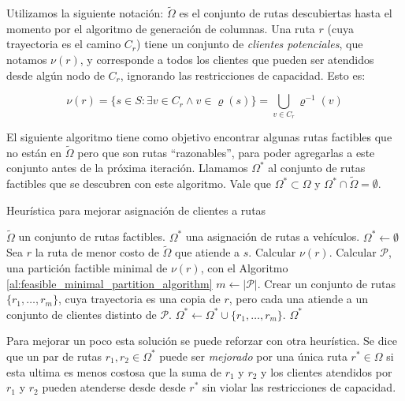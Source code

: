 Utilizamos la siguiente notación: $\tilde{\Omega}$ es el conjunto de rutas descubiertas hasta el momento por el algoritmo de generación de columnas. Una ruta $r$ (cuya trayectoria es el camino $C_r$) tiene un conjunto de \emph{clientes potenciales}, que notamos $\nu(r)$, y corresponde a todos los clientes que pueden ser atendidos desde algún nodo de $C_r$, ignorando las restricciones de capacidad. Esto es:

\begin{equation}
    \nu(r) = \{s \in S : \exists v \in C_r \wedge v \in \varrho(s)\} = \bigcup_{v \in C_r}{\varrho^{-1}(v)}
\end{equation}

El siguiente algoritmo tiene como objetivo encontrar algunas rutas factibles que no están en $\tilde{\Omega}$ pero que son rutas ``razonables'', para poder agregarlas a este conjunto antes de la próxima iteración. Llamamos $\Omega^{*}$ al conjunto de rutas factibles que se descubren con este algoritmo. Vale que $\Omega^{*} \subset \Omega$ y $\Omega^{*} \cap \tilde{\Omega} = \emptyset$.

\begin{algorithm}[H]
  \caption{Heurística para mejorar asignación de clientes a rutas}
  \label{al:2-step-cg-main}
  \begin{algorithmic}[1]
  	\Require $\tilde{\Omega}$ un conjunto de rutas factibles.
  	\Ensure $\Omega^{*}$ una asignación de rutas a vehículos. 
        \State $\Omega^{*} \gets \emptyset$
                \State Sea $r$ la ruta de menor costo de $\tilde{\Omega}$ que atiende a $s$.
                \State Calcular $\nu(r)$.
                \State Calcular $\mathscr{P}$, una partición factible minimal de $\nu(r)$, con el Algoritmo \ref{al:feasible_minimal_partition_algorithm}
                \State $m \gets |\mathscr{P}|$.
                \State Crear un conjunto de rutas $\{r_1, \dots, r_m\}$, cuya trayectoria es una copia de $r$, pero cada una atiende a un conjunto de clientes distinto de $\mathscr{P}$.
                \State $\Omega^{*} \gets \Omega^{*} \cup \{r_1, \dots, r_m\}$.
            \EndIf
        \EndFor
	\Return $\Omega^{*}$
  \end{algorithmic}
\end{algorithm}

Para mejorar un poco esta solución se puede reforzar con otra heurística. Se dice que un par de rutas $r_1, r_2 \in \Omega^{*}$ puede ser \emph{mejorado} por una única ruta $r^{*} \in \Omega$ si esta ultima es menos costosa que la suma de $r_1$ y $r_2$ y los clientes atendidos por $r_1$ y $r_2$ pueden atenderse desde desde $r^{*}$ sin violar las restricciones de capacidad.

